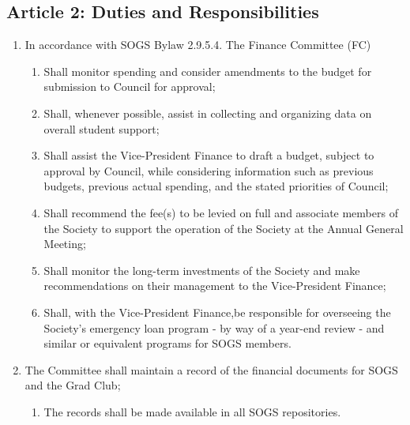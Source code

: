 \subsection{Article 2: Duties and Responsibilities}
\begin{enumerate}[label*=\arabic*., align=left]	
	\item In accordance with SOGS Bylaw 2.9.5.4. The Finance Committee (FC) 
	\begin{enumerate}[label*=\arabic*., align=left]	
		\item Shall monitor spending and consider amendments to the budget for submission to Council for approval;
		\item Shall, whenever possible, assist in collecting and organizing data on overall student support;
		\item Shall assist the Vice-President Finance to draft a budget, subject to approval by Council, while considering information such as previous budgets, previous actual spending, and the stated priorities of Council;
		\item Shall recommend the fee(s) to be levied on full and associate members of the Society to support the operation of the Society at the Annual General Meeting;
		\item Shall monitor the long-term investments of the Society and make recommendations on their management to the Vice-President Finance;
		\item Shall, with the Vice-President Finance,be responsible for overseeing the Society's emergency loan program - by way of a year-end review - and similar or equivalent programs for SOGS members. 
		\end{enumerate}
	\item The Committee shall maintain a record of the financial documents for SOGS and the Grad Club;
		\begin{enumerate}[label*=\arabic*., align=left]	
		\item The records shall be made available in all SOGS repositories.
		\end{enumerate}
	\end{enumerate}

